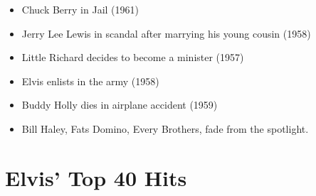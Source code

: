 \documentclass[12pt, a4paper, twoside, openright, titlepage]{book}
\begin{document}
\begin{itemize}
    \item Chuck Berry in Jail (1961)
    \item Jerry Lee Lewis in scandal after marrying his young cousin (1958)
    \item Little Richard decides to become a minister (1957)
    \item Elvis enlists in the army (1958)
    \item Buddy Holly dies in airplane accident (1959)
    \item Bill Haley, Fats Domino, Every Brothers, fade from the spotlight.
\end{itemize}





\section{Elvis' Top 40 Hits}
\end{document}
